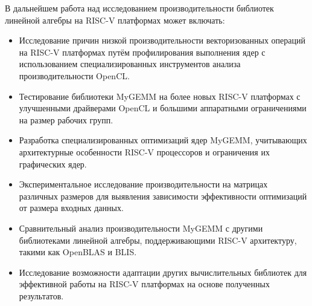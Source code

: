 В дальнейшем работа над исследованием производительности библиотек линейной алгебры на RISC-V платформах может включать:

\begin{itemize}
    \item Исследование причин низкой производительности векторизованных операций на RISC-V платформах путём профилирования выполнения ядер с использованием специализированных инструментов анализа производительности OpenCL.
    
    \item Тестирование библиотеки MyGEMM на более новых RISC-V платформах с улучшенными драйверами OpenCL и большими аппаратными ограничениями на размер рабочих групп.
    
    \item Разработка специализированных оптимизаций ядер MyGEMM, учитывающих архитектурные особенности RISC-V процессоров и ограничения их графических ядер.
    
    \item Экспериментальное исследование производительности на матрицах различных размеров для выявления зависимости эффективности оптимизаций от размера входных данных.
    
    \item Сравнительный анализ производительности MyGEMM с другими библиотеками линейной алгебры, поддерживающими RISC-V архитектуру, такими как OpenBLAS и BLIS.
    
    \item Исследование возможности адаптации других вычислительных библиотек для эффективной работы на RISC-V платформах на основе полученных результатов.
\end{itemize}